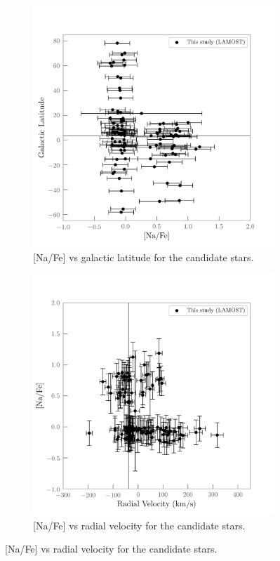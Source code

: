 \documentclass[a4paper,fleqn,usenatbib]{mnras}
\begin{document}
\begin{figure}
\begin{subfigure}{0.5\textwidth}
	\includegraphics[width=\columnwidth]{Navsb.png}
    \caption{[Na/Fe] vs galactic latitude for the candidate stars.}
    \label{Navsb}
\end{subfigure}%
\begin{subfigure}{0.5\textwidth}
	\includegraphics[width=\columnwidth]{Navsradvel.png}
    \caption{[Na/Fe] vs radial velocity for the candidate stars.}
    \label{Navsradvel}
\end{subfigure}


\end{figure}
\end{document}
